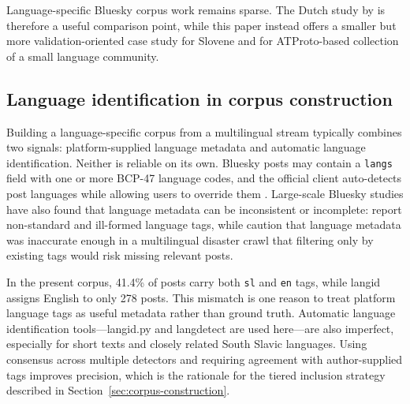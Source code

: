 Language-specific Bluesky corpus work remains sparse. The Dutch study by \textcite{tjongKimSang2025bluesky} is therefore a useful comparison point, while this paper instead offers a smaller but more validation-oriented case study for Slovene and for ATProto-based collection of a small language community.

\subsection{Language identification in corpus construction}

Building a language-specific corpus from a multilingual stream typically combines two signals: platform-supplied language metadata and automatic language identification. Neither is reliable on its own. Bluesky posts may contain a \texttt{langs} field with one or more BCP-47 language codes, and the official client auto-detects post languages while allowing users to override them \parencite{bsky-posts}. Large-scale Bluesky studies have also found that language metadata can be inconsistent or incomplete: \textcite{failla2024bluesky} report non-standard and ill-formed language tags, while \textcite{hanny2026disaster} caution that language metadata was inaccurate enough in a multilingual disaster crawl that filtering only by existing tags would risk missing relevant posts.

In the present corpus, 41.4\% of posts carry both \texttt{sl} and \texttt{en} tags, while langid assigns English to only 278 posts. This mismatch is one reason to treat platform language tags as useful metadata rather than ground truth. Automatic language identification tools---langid.py \parencite{lui2012langid} and langdetect \parencite{nakatani2010langdetect} are used here---are also imperfect, especially for short texts and closely related South Slavic languages. Using consensus across multiple detectors and requiring agreement with author-supplied tags improves precision, which is the rationale for the tiered inclusion strategy described in Section~\ref{sec:corpus-construction}.

